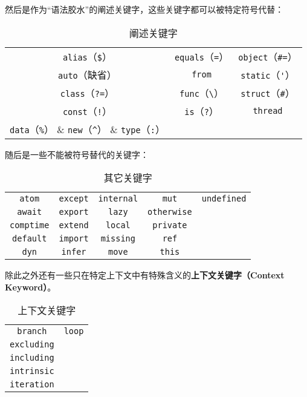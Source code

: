 然后是作为“语法胶水”的阐述关键字，这些关键字都可以被特定符号代替：

\begin{table}[H]
    \centering
    \begin{tabular}{|c|c|c|} \hline
        \lstinline!alias!（\texttt{\$}）   & \lstinline!equals!（\lstinline!=!） & \lstinline!object!（\lstinline!#=!）  \\
        \lstinline!auto!（缺省）	& \lstinline!from!  & \lstinline!static!（\lstinline!'!） \\
        \lstinline!class!（\lstinline!?=!）   & \lstinline!func!（\lstinline!\!） & \lstinline!struct!（\lstinline!#!）  \\
        \lstinline!const!（\lstinline|!|）   & \lstinline!is!（\lstinline!?!） 	& \lstinline!thread!  \\
        \lstinline!data!（\lstinline!%!）   & \lstinline!new!（\lstinline!^!）	& \lstinline!type!（\lstinline!:!）  \\\hline
    \end{tabular}
    \caption{阐述关键字}
    \label{tab:elaborator-keywords}
\end{table}

随后是一些不能被符号替代的关键字：

\begin{table}[H]
    \centering
    \begin{tabular}{|c|c|c|c|c|} \hline
        \lstinline!atom!    & \lstinline!except!    & \lstinline!internal!	& \lstinline!mut! 		& \lstinline!undefined!  \\
        \lstinline!await!   & \lstinline!export!    & \lstinline!lazy!     	& \lstinline!otherwise! & \\
        \lstinline!comptime!& \lstinline!extend!    & \lstinline!local!     & \lstinline!private! & \\
        \lstinline!default! & \lstinline!import!    & \lstinline!missing! 	& \lstinline!ref! & \\
        \lstinline!dyn!     & \lstinline!infer!  	& \lstinline!move!   	& \lstinline!this! & \\\hline
    \end{tabular}
    \caption{其它关键字}
    \label{tab:other-keywords}
\end{table}

除此之外还有一些只在特定上下文中有特殊含义的\textbf{上下文关键字（Context Keyword）}。

\begin{table}[H]
    \centering
    \begin{tabular}{|c|c|} \hline
        \lstinline!branch!    & \lstinline!loop! \\
        \lstinline!excluding! & \\
        \lstinline!including! & \\
        \lstinline!intrinsic! & \\
        \lstinline!iteration! & \\\hline
    \end{tabular}
    \caption{上下文关键字}
    \label{tab:context-keywords}
\end{table}

